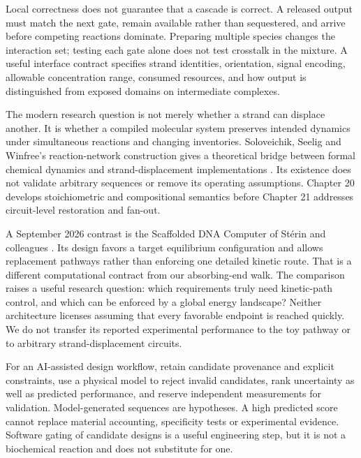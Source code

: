 Local correctness does not guarantee that a cascade is correct. A released
output must match the next gate, remain available rather than sequestered,
and arrive before competing reactions dominate. Preparing multiple species
changes the interaction set; testing each gate alone does not test crosstalk
in the mixture. A useful interface contract specifies strand identities,
orientation, signal encoding, allowable concentration range, consumed resources,
and how output is distinguished from exposed domains on intermediate complexes.

The modern research question is not merely whether a strand can displace
another. It is whether a compiled molecular system preserves intended dynamics
under simultaneous reactions and changing inventories. Soloveichik, Seelig and
Winfree's reaction-network construction gives a theoretical bridge between
formal chemical dynamics and strand-displacement implementations \cite{Soloveichik2010}.
Its existence does not validate arbitrary sequences or remove its operating
assumptions. Chapter 20 develops stoichiometric and compositional semantics
before Chapter 21 addresses circuit-level restoration and fan-out.

A September 2026 contrast is the Scaffolded DNA Computer of Stérin and
colleagues \cite{Sterin2026}. Its design favors a target equilibrium configuration
and allows replacement pathways rather than enforcing one detailed kinetic
route. That is a different computational contract from our absorbing-end walk.
The comparison raises a useful research question: which requirements truly
need kinetic-path control, and which can be enforced by a global energy
landscape? Neither architecture licenses assuming that every favorable endpoint
is reached quickly. We do not transfer its reported experimental performance
to the toy pathway or to arbitrary strand-displacement circuits.

For an AI-assisted design workflow, retain candidate provenance and explicit
constraints, use a physical model to reject invalid candidates, rank uncertainty
as well as predicted performance, and reserve independent measurements for
validation. Model-generated sequences are hypotheses. A high predicted score
cannot replace material accounting, specificity tests or experimental evidence.
Software gating of candidate designs is a useful engineering step, but it is
not a biochemical reaction and does not substitute for one.

